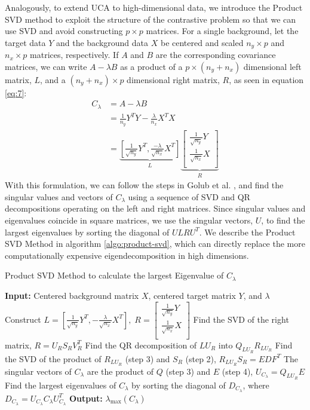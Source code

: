 \documentclass[10pt]{article}
\begin{document}
Analogously, to extend UCA to high-dimensional data, we introduce the Product SVD method to exploit the structure of the contrastive problem so that we can use SVD and avoid constructing $p \times p$ matrices. For a single background, let the target data $Y$ and the background data $X$ be centered and scaled $n_y \times p$ and $n_x \times p$ matrices, respectively. If $A$ and $B$ are the corresponding covariance matrices, we can write $A - \lambda B$ as a product of a $p \times (n_y + n_x)$ dimensional left matrix, $L$, and a $(n_y + n_x) \times p$ dimensional right matrix, $R$, as seen in equation \ref{eq:7}:
\begin{align}
  C_\lambda &= A - \lambda B \nonumber\\
            &=\frac{1}{n_y}Y^TY -\frac{\lambda}{n_x} X^T X\nonumber \\
            &=  \underbrace{\left[ \frac{1}{\sqrt{n_{y}}}Y^T,  \frac{-\lambda}{\sqrt{n_{x}}} X^T\right]}_{L}\underbrace{\begin{bmatrix*} \frac{1}{\sqrt{n_{y}}}Y \\ \frac{1}{\sqrt{n_{x}}}X \\ \end{bmatrix*}}_{R} \label{eq:7}
\end{align}
With this formulation, we can follow the steps in Golub et al.  \cite{Golub}, and find the singular values and vectors of $C_\lambda$ using a sequence of SVD and QR decompositions operating on the left and right matrices. Since singular values and eigenvalues coincide in square matrices, we use the singular vectors, $U$, to find the largest eigenvalues by sorting the diagonal of $ULRU^T$.  
We describe the Product SVD Method in algorithm \ref{algo:product-svd}, which can directly replace the more computationally expensive eigendecomposition in high dimensions.

\begin{algorithm}[ht]
  \caption{Product SVD Method to calculate the largest Eigenvalue of $C_\lambda$}
  \label{algo:product-svd}
  \SetAlgoLined
  \textbf{Input:} Centered background matrix $X$, centered target matrix $Y$, and $\lambda$\;
  \nl Construct 
  $  L = \left[ \frac{1}{\sqrt{n_{y}}}Y^T, - \frac{\lambda}{\sqrt{n_{x}}} X^T\right],\;
  R = \begin{bmatrix*} \frac{1}{\sqrt{n_{y}}}Y \\ \frac{1}{\sqrt{n_{x}}}X \\ \end{bmatrix*} $\;
  \nl  Find the SVD of the right matrix, $R = U_R S_R V^T_R$ \;
  \nl  Find the QR decomposition of $LU_R$ into  $Q_{LU_R}R_{LU_R}$ \;
  \nl  Find the SVD of the product of $R_{LU_R}$ (step 3) and $S_R$ (step 2), $R_{LU_R}S_{R} = EDF^T$ \;
  \nl  The singular vectors of $C_\lambda$ are the product of $Q$ (step 3) and $E$ (step 4), $U_{C_\lambda} = Q_{LU_R}E$ \;
  \nl  Find the largest eigenvalues of $C_\lambda$ by sorting the diagonal of $D_{C_\lambda}$, where $D_{C_\lambda} = U_{C_\lambda} C_\lambda U_{C_\lambda}^T$ \;
  \textbf{Output:} $\lambda_{\text{max}}\left( C_\lambda \right)$ 
\end{algorithm}
\end{document}
